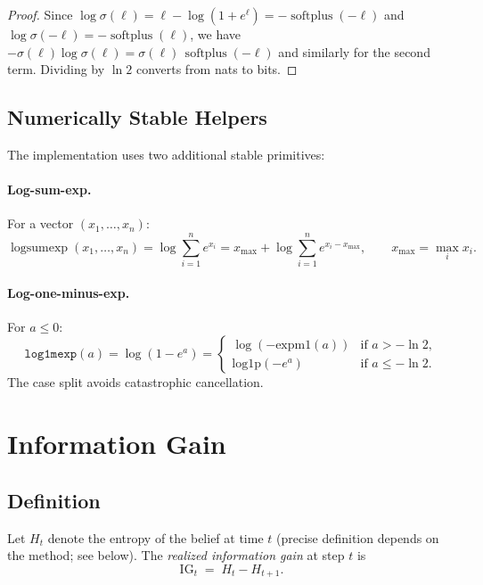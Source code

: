 \documentclass[11pt]{article}
\newcommand{\sigmoid}{\sigma}
\DeclareMathOperator{\softplus}{softplus}
\DeclareMathOperator{\logsumexp}{logsumexp}
\begin{document}
\begin{proof}
Since $\log \sigmoid(\ell) = \ell - \log(1+e^\ell) = -\softplus(-\ell)$
and $\log \sigmoid(-\ell) = -\softplus(\ell)$, we have
$-\sigmoid(\ell)\log\sigmoid(\ell) = \sigmoid(\ell)\,\softplus(-\ell)$
and similarly for the second term.  Dividing by $\ln 2$ converts from
nats to bits.
\end{proof}

\subsection{Numerically Stable Helpers}

The implementation uses two additional stable primitives:

\paragraph{Log-sum-exp.}
For a vector $(x_1, \dots, x_n)$:
\[
  \logsumexp(x_1, \dots, x_n) = \log\!\sum_{i=1}^n e^{x_i}
  = x_{\max} + \log\!\sum_{i=1}^n e^{x_i - x_{\max}},
  \qquad x_{\max} = \max_i x_i.
\]

\paragraph{Log-one-minus-exp.}
For $a \leq 0$:
\[
  \texttt{log1mexp}(a) = \log(1 - e^a) =
  \begin{cases}
    \log(-\text{expm1}(a)) & \text{if } a > -\ln 2, \\
    \text{log1p}(-e^a)     & \text{if } a \leq -\ln 2.
  \end{cases}
\]
The case split avoids catastrophic cancellation.

\section{Information Gain}
\label{sec:ig}

\subsection{Definition}

Let $H_t$ denote the entropy of the belief at time $t$ (precise definition
depends on the method; see below).  The \emph{realized information gain}
at step $t$ is
\[
  \mathrm{IG}_t \;=\; H_t - H_{t+1}.
\]
\end{document}
